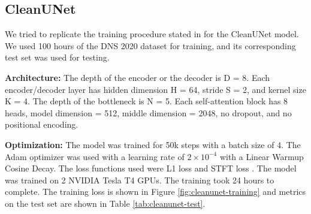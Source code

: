 \subsection{CleanUNet}
We tried to replicate the training procedure stated in \cite{kong2022} for the CleanUNet model. We used 100 hours of the DNS 2020 dataset \cite{reddy2020} for training, and its corresponding test set was used for testing.

\textbf{Architecture:} The depth of the encoder or the decoder is D = 8. Each encoder/decoder layer has hidden dimension H = 64, stride S = 2, and kernel size K = 4.
The depth of the bottleneck is N = 5. Each self-attention block has 8 heads, model dimension = 512, middle dimension = 2048, no dropout, and no positional encoding.

\textbf{Optimization:} The model was trained for 50k steps with a batch size of 4. The Adam \cite{kingma2017adam} optimizer was used with a learning rate of $2\times 10^{-4}$ with a Linear Warmup Cosine Decay. The loss functions used were L1 loss and STFT loss \cite{defossez2020}.
The model was trained on 2 NVIDIA Tesla T4 GPUs. The training took 24 hours to complete. The training loss is shown in Figure \ref{fig:cleanunet-training} and metrics on the test set are shown in Table \ref{tab:cleanunet-test}.

